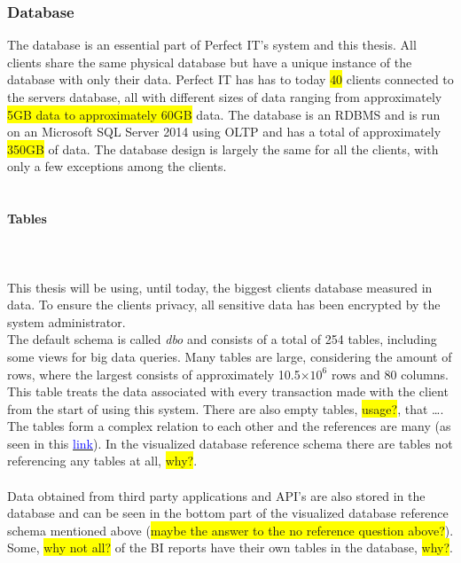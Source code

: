 \documentclass{cslthse-msc}
\newcommand{\hilight}[1]{\colorbox{yellow}{#1}}
\begin{document}
\subsubsection{Database}
The database is an essential part of Perfect IT's system and this thesis. All clients share the same physical database but have a unique instance of the database with only their data.  Perfect IT has has to today \hilight{40} clients connected to the servers database, all with different sizes of data ranging from approximately \hilight{5GB data to approximately 60GB} data. The database is an RDBMS and is run on an Microsoft SQL Server 2014 using OLTP and has a total of approximately \hilight{350GB} of data. The database design is largely the same for all the clients, with only a few exceptions among the clients.\\\\ 

\paragraph*{Tables}\mbox{}\\\\
This thesis will be using, until today, the biggest clients database measured in data. To ensure the clients privacy, all sensitive data has been encrypted by the system administrator. \\The default schema is called \textit{dbo} and consists of a total of 254 tables, including some views for big data queries. Many tables are large, considering the amount of rows, where the largest consists of approximately 10.5$\times 10^6$ rows and 80 columns. This table treats the data associated with every transaction made with the client from the start of using this system. There are also empty tables, \hilight{usage?}, that \ldots. The tables form a complex relation to each other and the references are many (as seen in this \href{https://drive.google.com/file/d/0B1IYTmE2hnD-eGQ0N2tvYXZNNVE/view?usp=sharing}{\textcolor{blue}{link}}). In the visualized database reference schema there are tables not referencing any tables at all, \hilight{why?}.\\\\Data obtained from third party applications and API's are also stored in the database and can be seen in the bottom part of the visualized database reference schema mentioned above (\hilight{maybe the answer to the no reference question above?}). Some, \hilight{why not all?} of the BI reports have their own tables in the database, \hilight{why?}.
\end{document}
